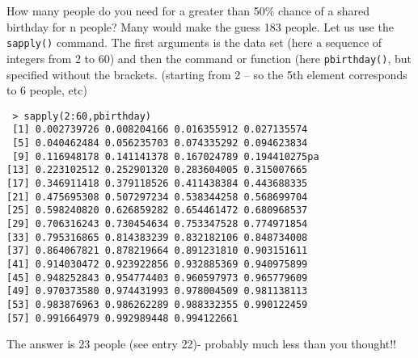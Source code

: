 \documentclass[11pt]{article} %
\begin{document}
\noindent How many people do you need for a greater than 50\% chance of a shared birthday for n people? Many would make the guess 183 people.  Let us use the \texttt{sapply()} command. The first arguments is the data set (here a sequence of integers from 2 to 60) and then the command or function (here \texttt{pbirthday()}, but specified without the brackets.
(starting from 2 – so the 5th element corresponds to 6 people, etc)
\begin{verbatim}
 > sapply(2:60,pbirthday)
 [1] 0.002739726 0.008204166 0.016355912 0.027135574
 [5] 0.040462484 0.056235703 0.074335292 0.094623834
 [9] 0.116948178 0.141141378 0.167024789 0.194410275pa
[13] 0.223102512 0.252901320 0.283604005 0.315007665
[17] 0.346911418 0.379118526 0.411438384 0.443688335
[21] 0.475695308 0.507297234 0.538344258 0.568699704
[25] 0.598240820 0.626859282 0.654461472 0.680968537
[29] 0.706316243 0.730454634 0.753347528 0.774971854
[33] 0.795316865 0.814383239 0.832182106 0.848734008
[37] 0.864067821 0.878219664 0.891231810 0.903151611
[41] 0.914030472 0.923922856 0.932885369 0.940975899
[45] 0.948252843 0.954774403 0.960597973 0.965779609
[49] 0.970373580 0.974431993 0.978004509 0.981138113
[53] 0.983876963 0.986262289 0.988332355 0.990122459
[57] 0.991664979 0.992989448 0.994122661
\end{verbatim}
The answer is 23 people (see entry 22)- probably much less than you thought!!
\end{document}
